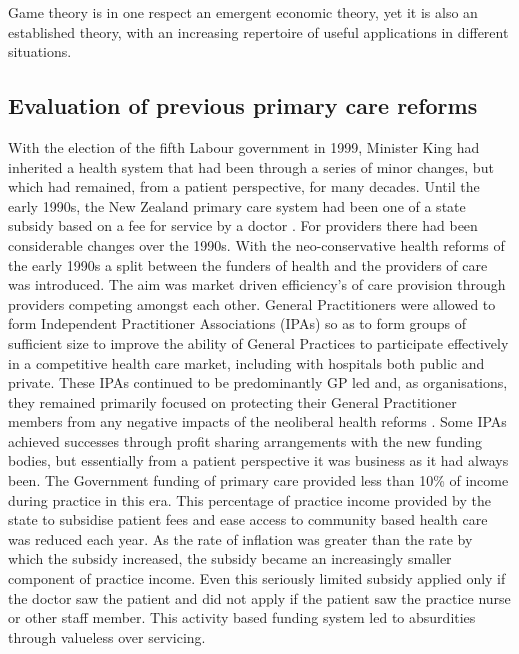 \documentclass[11pt,a4paper]{article}
\begin{document}
Game theory is in one respect an emergent economic theory, yet it is also an established theory, with an increasing repertoire of useful applications in different situations. \\

\subsection{Evaluation of previous primary care reforms}
With the election of the fifth Labour government in 1999, Minister King had inherited a health system that had been through a series of minor changes, but which had remained, from a patient perspective, for many decades. Until the early 1990s, the New Zealand primary care system had been one of a state subsidy based on a fee for service by a doctor \citep{gauld2006new}. For providers there had been considerable changes over the 1990s. With the neo-conservative health reforms of the early 1990s a split between the funders of health and the providers of care was introduced. The aim was market driven efficiency's of care provision through providers competing amongst each other. General Practitioners were allowed to form Independent Practitioner Associations (IPAs) so as to form groups of sufficient size to improve the ability of General Practices to participate effectively in a competitive health care market, including with hospitals both public and private. These IPAs continued to be predominantly GP led and, as organisations, they remained primarily focused on protecting their General Practitioner members from any negative impacts of the neoliberal health reforms \citep{malcolm1999new}. Some IPAs achieved successes through profit sharing arrangements with the new funding bodies, but essentially from a patient perspective it was business as it had always been. The Government funding of primary care provided less than 10\% of income during practice in this era. This percentage of practice income provided by the state to subsidise patient fees and ease access to community based health care was reduced each year. As the rate of inflation was greater than the rate by which the subsidy increased, the subsidy became an increasingly smaller component of practice income. Even this seriously limited subsidy applied only if the doctor saw the patient and did not apply if the patient saw the practice nurse or other staff member. This activity based funding system led to absurdities through valueless over servicing. \\    
\end{document}
